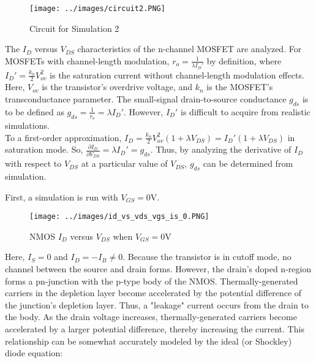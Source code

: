 \FloatBarrier

\begin{figure}[h!]
	\centering
	\texttt{[image: ../images/circuit2.PNG]}
	\caption{Circuit for Simulation 2}
	\label{fig:circuit2}
\end{figure}

\FloatBarrier

The $I_{D}$ versus $V_{DS}$ characteristics of the n-channel MOSFET are analyzed.
For MOSFETs with channel-length modulation, $r_{o} = \frac{1}{\lambda I_{D}'}$ by definition, where $I_{D}' = \frac{k_{n}}{2} V_{ov}^2$ is the saturation current without channel-length modulation effects.
Here, $V_{ov}$ is the transistor's overdrive voltage, and $k_{n}$ is the MOSFET's transconductance parameter.
The small-signal drain-to-source conductance $g_{ds}$ is to be defined as $g_{ds} = \frac{1}{r_{o}} = \lambda I_{D}'$.
However, $I_{D}'$ is difficult to acquire from realistic simulations. \\

To a first-order approximation, $I_{D} = \frac{k_{n}}{2} V_{ov}^2 ( 1 + \lambda V_{DS} ) = I_{D}' ( 1 + \lambda V_{DS} )$ in saturation mode.
So, $\frac{ \partial I_{D} }{ \partial V_{DS} } = \lambda I_{D}' = g_{ds}$.
Thus, by analyzing the derivative of $I_{D}$ with respect to $V_{DS}$ at a particular value of $V_{DS}$, $g_{ds}$ can be determined from simulation.

First, a simulation is run with $V_{GS} = 0$\si{\volt}.


\FloatBarrier

\begin{figure}[h!]
	\centering
	\texttt{[image: ../images/id\_vs\_vds\_vgs\_is\_0.PNG]}
	\caption{NMOS $I_{D}$ versus $V_{DS}$ when $V_{GS} = 0$\si{\volt}}
	\label{fig:id_vs_vds_vgs_is_0}
\end{figure}

\FloatBarrier

Here, $I_{S} = 0$ and $I_{D} = -I_{B} \neq 0$.
Because the transistor is in cutoff mode, no channel between the source and drain forms.
However, the drain's doped n-region forms a pn-junction with the p-type body of the NMOS.
Thermally-generated carriers in the depletion layer become accelerated by the potential difference of the junction's depletion layer.
Thus, a "leakage" current occurs from the drain to the body.
As the drain voltage increases, thermally-generated carriers become accelerated by a larger potential difference, thereby increasing the current.
This relationship can be somewhat accurately modeled by the ideal (or Shockley) diode equation:

